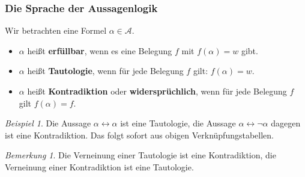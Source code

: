 \documentclass[hyperref={pdfpagelabels=false}]{beamer}
\theoremstyle{plain}%
\theoremstyle{definition}
\theoremstyle{remark}
\newtheorem*{beispiel}{Beispiel}
\newtheorem*{notiz}{Bemerkung}
\begin{document}
\begin{frame}
\frametitle{Die Sprache der Aussagenlogik}

\begin{definition} Wir betrachten eine Formel $\alpha \in \mathcal{A}$.

\begin{itemize}
\item $\alpha$ heißt \textbf{erfüllbar}, wenn es eine Belegung $f$ mit $f(\alpha) = w$ gibt.
\item $\alpha$ heißt \textbf{Tautologie}, wenn für jede Belegung $f$ gilt: $f(\alpha) = w$.
\item $\alpha$ heißt \textbf{Kontradiktion} oder \textbf{widersprüchlich}, wenn für jede 
Belegung $f$ gilt $f(\alpha) = f$.
\end{itemize}
\end{definition}

\pause 

\begin{beispiel} Die Aussage $\alpha \leftrightarrow \alpha$ ist eine Tautologie, die Aussage $\alpha \leftrightarrow 
\neg \alpha$ dagegen ist eine Kontradiktion. Das folgt sofort aus obigen Verknüpfungstabellen.
\end{beispiel}

\pause 

\begin{notiz} Die Verneinung einer Tautologie ist eine Kontradiktion, die Verneinung einer Kontradiktion ist 
eine Tautologie.
\end{notiz}


\end{frame}
\end{document}
